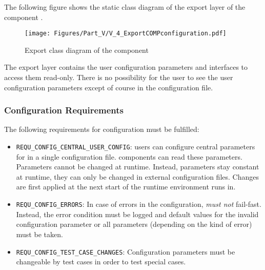 The following figure shows the static class diagram of the export layer of the component \COMPconfiguration{}.

\begin{figure}[H]
	\centering
	\texttt{[image: Figures/Part\_V/V\_4\_ExportCOMPconfiguration.pdf]}
	\caption{Export class diagram of the component \COMPconfiguration{}}
	\label{fig:V_4_ExportCOMPconfiguration}
\end{figure}

The export layer contains the user configuration parameters and interfaces to access them read-only. There is no possibility for the user to see the user configuration parameters except of course in the configuration file.


\subsubsection{Configuration Requirements}
\label{sec:ConfigurationRequirements}

\newcommand{\REQUconfigUserConfig}{\texttt{REQU\_CONFIG\_CENTRAL\_USER\_CONFIG}}
\newcommand{\REQUconfigErrors}{\texttt{REQU\_CONFIG\_ERRORS}}
\newcommand{\REQUconfigTestCaseChanges}{\texttt{REQU\_CONFIG\_TEST\_CASE\_CHANGES}}

The following requirements for \LibName{} configuration must be fulfilled:
\begin{itemize}
	\item \REQUconfigUserConfig{}: \LibName{} users can configure central parameters for \LibName{} in a single configuration file. \LibName{} components can read these parameters. Parameters cannot be changed at runtime. Instead, parameters stay constant at runtime, they can only be changed in external configuration files. Changes are first applied at the next start of the runtime environment \LibName{} runs in.
	\item \REQUconfigErrors{}: In case of errors in the configuration, \LibName{} \emph{must not} fail-fast. Instead, the error condition must be logged and default values for the invalid configuration parameter or all parameters (depending on the kind of error) must be taken.
	\item \REQUconfigTestCaseChanges{}: Configuration parameters must be changeable by test cases in order to test special cases.
\end{itemize}

